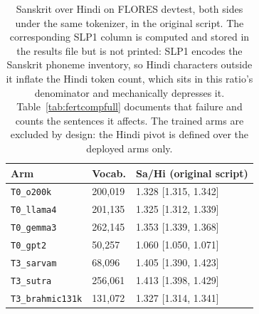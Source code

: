 \begin{table}[t]
\centering
\footnotesize
\begin{tabular}{lll}
\toprule
Arm & Vocab. & Sa/Hi (original script) \\
\midrule
\texttt{T0\_o200k} & 200,019 & 1.328 [1.315, 1.342] \\
\texttt{T0\_llama4} & 201,135 & 1.325 [1.312, 1.339] \\
\texttt{T0\_gemma3} & 262,145 & 1.353 [1.339, 1.368] \\
\texttt{T0\_gpt2} & 50,257 & 1.060 [1.050, 1.071] \\
\texttt{T3\_sarvam} & 68,096 & 1.405 [1.390, 1.423] \\
\texttt{T3\_sutra} & 256,061 & 1.413 [1.398, 1.429] \\
\texttt{T3\_brahmic131k} & 131,072 & 1.327 [1.314, 1.341] \\
\bottomrule
\end{tabular}
\caption{Sanskrit over Hindi on FLORES devtest, both sides under the same tokenizer, in the original script. The corresponding SLP1 column is computed and stored in the results file but is not printed: SLP1 encodes the Sanskrit phoneme inventory, so Hindi characters outside it inflate the Hindi token count, which sits in this ratio's denominator and mechanically depresses it. Table~\ref{tab:fertcompfull} documents that failure and counts the sentences it affects. The trained arms are excluded by design: the Hindi pivot is defined over the deployed arms only.}
\label{tab:tpphindi}
\end{table}
